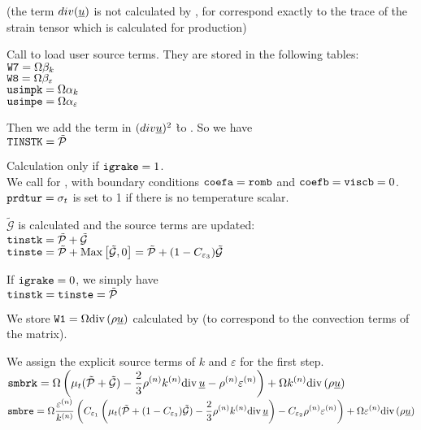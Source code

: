 (the term $div(\underline{u})$ is not calculated by , for
correspond exactly to the trace of the strain tensor which is
calculated for production)

Call  to load user source terms. They are
stored in the following tables:\\
$\text{\texttt{W7}}=\Omega\beta_k$\\
$\text{\texttt{W8}}=\Omega\beta_\varepsilon$\\
$\text{\texttt{usimpk}}=\Omega\alpha_k$\\
$\text{\texttt{usimpe}}=\Omega\alpha_\varepsilon$

Then we add the term in $(div\underline{u})^2$ \` to . So we have \\
$\text{\texttt{TINSTK}}=\tilde{\mathcal{P}}$

Calculation only if $\text{\texttt{igrake}}=1$.\\
We call  for , with boundary conditions
$\text{\texttt{coefa}}=\text{\texttt{romb}}$ and \mbox{$\text{\texttt{coefb}}=\text{\texttt{viscb}}=0$}.\\
$\text{\texttt{prdtur}}=\sigma_t$ is set to 1 if there is no temperature scalar.

$\tilde{\mathcal{G}}$ is calculated and the source terms are updated:\\
$\text{\texttt{tinstk}}=\tilde{\mathcal{P}}+\tilde{\mathcal{G}}$\\
$\text{\texttt{tinste}}=\tilde{\mathcal{P}}+\text{Max}\left[\tilde{\mathcal{G}},0\right]
=\tilde{\mathcal{P}}+(1-C_{\varepsilon_3})\tilde{\mathcal{G}}$

If $\text{\texttt{igrake}}=0$, we simply have\\
$\text{\texttt{tinstk}}=\text{\texttt{tinste}}=\tilde{\mathcal{P}}$

We store
$\displaystyle \text{\texttt{W1}}=\Omega\text{div}\,(\rho\underline{u})$
calculated by  (to correspond to the convection terms of the
matrix).

We assign the explicit source terms of $k$ and $\varepsilon$ for the
first step.\\
$\displaystyle\text{\texttt{smbrk}}=\Omega\left(\mu_t(\tilde{\mathcal{P}}+\tilde{\mathcal{G}})
-\frac{2}{3}\rho^{(n)} k^{(n)}\text{div}\,{\underline{u}}
-\rho^{(n)} \varepsilon^{(n)}\right)+\Omega k^{(n)}\text{div}\,(\rho\underline{u})$\\
$\displaystyle\text{\texttt{smbre}}=\Omega\frac{\varepsilon^{(n)}}{k^{(n)}}
\left(C_{\varepsilon_1}\left(
\mu_t(\tilde{\mathcal{P}}+(1-C_{\varepsilon_3})\tilde{\mathcal{G}})
-\frac{2}{3}\rho^{(n)} k^{(n)}\text{div}\,{\underline{u}}\right)
-C_{\varepsilon_2}\rho^{(n)}\varepsilon^{(n)}\right)
+\Omega\varepsilon^{(n)}\text{div}\,(\rho\underline{u})$

